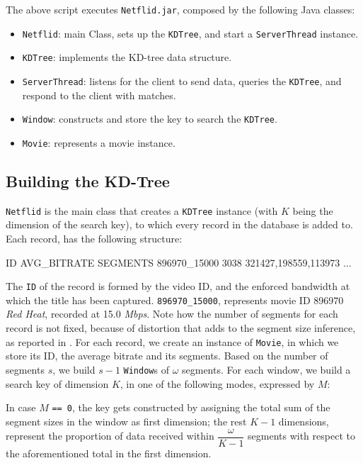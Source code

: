 The above script executes \texttt{Netflid.jar}, composed by the following
Java classes:

\begin{itemize}
    \item \texttt{Netflid}: main Class, sets up the \texttt{KDTree}, and start a
        \texttt{ServerThread} instance.
    \item \texttt{KDTree}: implements the KD-tree data structure.
    \item \texttt{ServerThread}: listens for the client to send data, queries
        the \texttt{KDTree}, and respond to the client with matches.
    \item \texttt{Window}: constructs and store the key to search the \texttt{KDTree}.
    \item \texttt{Movie}: represents a movie instance.

\end{itemize}

\subsection{Building the KD-Tree}

\texttt{Netflid} is the main class that creates a \texttt{KDTree} instance
(with $K$ being the dimension of the search key), to which every record in the
database is added to. Each record, has the following structure:

\begin{bash_script} 
ID              AVG_BITRATE  SEGMENTS
896970_15000    3038         321427,198559,113973 ...
\end{bash_script}

The \texttt{ID} of the record is formed by the video ID, and the enforced
bandwidth at which the title has been captured.  \texttt{896970\_15000},
represents movie ID 896970 \emph {Red Heat}, recorded at 15.0 \emph{Mbps}. Note
how the number of segments for each record is not fixed, because of distortion
that adds to the segment size inference, as reported in .
For each record, we create an instance of \texttt{Movie}, in which we store its
ID, the average bitrate and its segments.  Based on the number of segments $s$,
we build $s-1$ \texttt{Window}s of $\omega$ segments.  For each window, we
build a search key of dimension $K$, in one of the following modes, expressed
by $M$: 

In case $M$ \texttt{== 0}, the key gets constructed by assigning the
total sum of the segment sizes in the window as first dimension; the
rest $K - 1$ dimensions, represent the proportion of data received
within $\dfrac{\omega}{K-1}$ segments with respect to the
aforementioned total in the first dimension.

